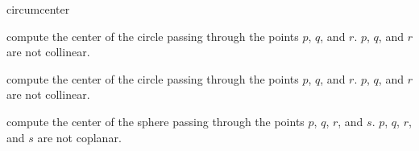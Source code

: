 \begin{ccRefFunction}{circumcenter}

 {compute the center of the circle passing through the points $p$, $q$, and $r$.
  \ccPrecond $p$, $q$, and $r$ are not collinear.}


 {compute the center of the circle passing through the points $p$, $q$, and $r$.
  \ccPrecond $p$, $q$, and $r$ are not collinear.}

 {compute the center of the sphere passing through the points $p$, $q$, $r$, and $s$.
  \ccPrecond $p$, $q$, $r$, and $s$ are not coplanar.}
\end{ccRefFunction}

